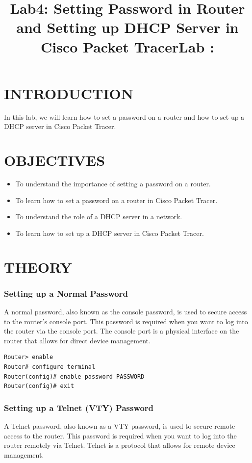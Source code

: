 \documentclass[a4paper,12pt]{article}
\title{Lab4: Setting Password in Router and Setting up DHCP Server in Cisco Packet Tracer}
\author{\cName}
\title{Lab \cLabNumber: \cTitle}
\date{}
\author{}
\begin{document}
\maketitle
\vspace{-2cm}
\section*{INTRODUCTION}
In this lab, we will learn how to set a password on a router and how to set up a DHCP server in Cisco Packet Tracer.

\section*{OBJECTIVES}
\begin{itemize}
    \item To understand the importance of setting a password on a router.
    \item To learn how to set a password on a router in Cisco Packet Tracer.
    \item To understand the role of a DHCP server in a network.
    \item To learn how to set up a DHCP server in Cisco Packet Tracer.
\end{itemize}

\section*{THEORY}

\subsubsection*{Setting up a Normal Password}
A normal password, also known as the console password, is used to secure access to the router's console port. This password is required when you want to log into the router via the console port. The console port is a physical interface on the router that allows for direct device management.

\begin{verbatim}
Router> enable
Router# configure terminal
Router(config)# enable password PASSWORD
Router(config)# exit
\end{verbatim}



\subsubsection*{Setting up a Telnet (VTY) Password}
A Telnet password, also known as a VTY password, is used to secure remote access to the router. This password is required when you want to log into the router remotely via Telnet. Telnet is a protocol that allows for remote device management.
\end{document}

